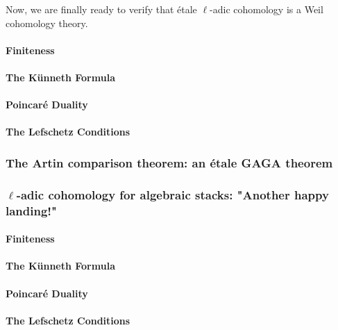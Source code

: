                 Now, we are finally ready to verify that \'etale $\ell$-adic cohomology is a Weil cohomology theory.
                \paragraph{Finiteness}
            
                \paragraph{The K\"unneth Formula}
                
                \paragraph{Poincar\'e Duality}
            
                \paragraph{The Lefschetz Conditions}
        
            \subsubsection{The Artin comparison theorem: an \'etale GAGA theorem}
            
            \subsubsection{\texorpdfstring{$\ell$}{}-adic cohomology for algebraic stacks: "Another happy landing!"}
                \paragraph{Finiteness}
            
                \paragraph{The K\"unneth Formula}
                
                \paragraph{Poincar\'e Duality}
            
                \paragraph{The Lefschetz Conditions}
                
    